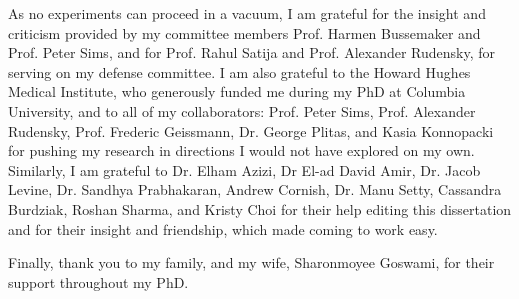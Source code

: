 As no experiments can proceed in a vacuum, I am grateful for the insight and criticism provided by my committee members Prof. Harmen Bussemaker and Prof. Peter Sims, and for Prof. Rahul Satija and Prof. Alexander Rudensky, for serving on my defense committee.    
I am also grateful to the Howard Hughes Medical Institute, who generously funded me during my PhD at Columbia University, and to all of my collaborators: Prof. Peter Sims, Prof. Alexander Rudensky, Prof. Frederic Geissmann, Dr. George Plitas, and Kasia Konnopacki for pushing my research in directions I would not have explored on my own.  
Similarly, I am grateful to Dr. Elham Azizi, Dr El-ad David Amir, Dr. Jacob Levine, Dr. Sandhya Prabhakaran, Andrew Cornish, Dr. Manu Setty, Cassandra Burdziak, Roshan Sharma, and Kristy Choi for their help editing this dissertation and for their insight and friendship, which made coming to work easy.  

Finally, thank you to my family, and my wife, Sharonmoyee Goswami, for their support throughout my PhD. 

